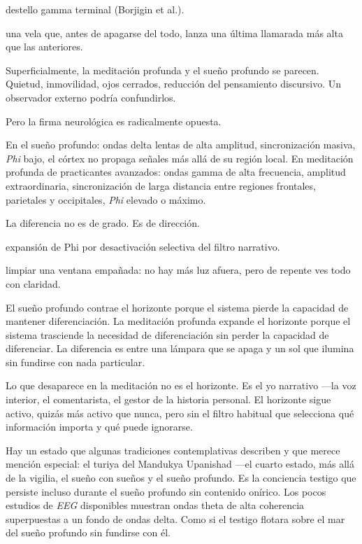 \begin{fisica}
 destello gamma terminal (Borjigin et al.).

 una vela que, antes de apagarse del todo, lanza una última llamarada más alta que las anteriores.
\end{fisica}
\noindent Superficialmente, la meditación profunda y el sueño profundo se parecen. Quietud, inmovilidad, ojos cerrados, reducción del pensamiento discursivo. Un observador externo podría confundirlos.

Pero la firma neurológica es radicalmente opuesta.

En el sueño profundo: ondas delta lentas de alta amplitud, sincronización masiva, \emph{Phi} bajo, el córtex no propaga señales más allá de su región local. En meditación profunda de practicantes avanzados: ondas gamma de alta frecuencia, amplitud extraordinaria, sincronización de larga distancia entre regiones frontales, parietales y occipitales, \emph{Phi} elevado o máximo.

La diferencia no es de grado. Es de dirección.

\begin{fisica}
 expansión de Phi por desactivación selectiva del filtro narrativo.

 limpiar una ventana empañada: no hay más luz afuera, pero de repente ves todo con claridad.
\end{fisica}
El sueño profundo contrae el horizonte porque el sistema pierde la capacidad de mantener diferenciación. La meditación profunda expande el horizonte porque el sistema trasciende la necesidad de diferenciación sin perder la capacidad de diferenciar. La diferencia es entre una lámpara que se apaga y un sol que ilumina sin fundirse con nada particular.

Lo que desaparece en la meditación no es el horizonte. Es el yo narrativo —la voz interior, el comentarista, el gestor de la historia personal. El horizonte sigue activo, quizás más activo que nunca, pero sin el filtro habitual que selecciona qué información importa y qué puede ignorarse.

Hay un estado que algunas tradiciones contemplativas describen y que merece mención especial: el turiya del Mandukya Upanishad —el cuarto estado, más allá de la vigilia, el sueño con sueños y el sueño profundo. Es la conciencia testigo que persiste incluso durante el sueño profundo sin contenido onírico. Los pocos estudios de \emph{EEG} disponibles muestran ondas theta de alta coherencia superpuestas a un fondo de ondas delta. Como si el testigo flotara sobre el mar del sueño profundo sin fundirse con él.

